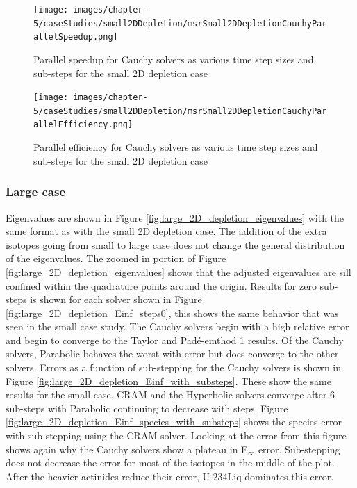\begin{figure}[p]
    \centering
    \texttt{[image: images/chapter-5/caseStudies/small2DDepletion/msrSmall2DDepletionCauchyParallelSpeedup.png]}
    \caption{Parallel speedup for Cauchy solvers as various time step sizes and sub-steps for the small 2D depletion case}
    \label{fig:small_2D_depletion_cauchy_speedup}
\end{figure}

\clearpage

\begin{figure}[p]
    \centering
    \texttt{[image: images/chapter-5/caseStudies/small2DDepletion/msrSmall2DDepletionCauchyParallelEfficiency.png]}
    \caption{Parallel efficiency for Cauchy solvers as various time step sizes and sub-steps for the small 2D depletion case}
    \label{fig:small_2D_depletion_cauchy_parallel_eff}
\end{figure}

\clearpage

\subsubsection{Large case}
Eigenvalues are shown in Figure \ref{fig:large_2D_depletion_eigenvalues} with the same format as with the small 2D depletion case. The addition of the extra isotopes going from small to large case does not change the general distribution of the eigenvalues. The zoomed in portion of Figure \ref{fig:large_2D_depletion_eigenvalues} shows that the adjusted eigenvalues are sill confined within the quadrature points around the origin. Results for zero sub-steps is shown for each solver shown in Figure \ref{fig:large_2D_depletion_Einf_steps0}, this shows the same behavior that was seen in the small case study. The Cauchy solvers begin with a high relative error and begin to converge to the Taylor and Pad\'e-emthod 1 results. Of the Cauchy solvers, Parabolic behaves the worst with error but does converge to the other solvers. Errors as a function of sub-stepping for the Cauchy solvers is shown in Figure \ref{fig:large_2D_depletion_Einf_with_substeps}. These show the same results for the small case, CRAM and the Hyperbolic solvers converge after 6 sub-steps with Parabolic continuing to decrease with steps. Figure \ref{fig:large_2D_depletion_Einf_species_with_substeps} shows the species error with sub-stepping using the CRAM solver. Looking at the error from this figure shows again why the Cauchy solvers show a plateau in E${}_{\infty}$ error. Sub-stepping does not decrease the error for most of the isotopes in the middle of the plot. After the heavier actinides reduce their error, U-234Liq dominates this error. 


